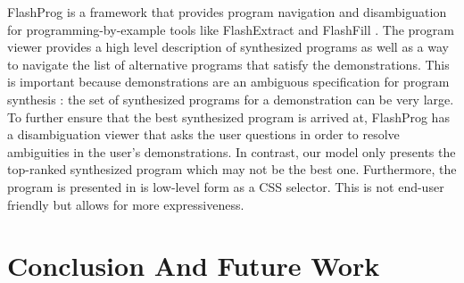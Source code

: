 \documentclass[sigconf,10pt]{acmart}
\begin{document}
FlashProg \citep{mayer2015} is a framework that provides program
navigation and disambiguation for programming-by-example tools like
FlashExtract \citep{le2014} and FlashFill \citep{harris}. The program
viewer provides a high level description of synthesized programs as well
as a way to navigate the list of alternative programs that satisfy the
demonstrations. This is important because demonstrations are an
ambiguous specification for program synthesis \citep{peleg2018}: the set
of synthesized programs for a demonstration can be very large. To
further ensure that the best synthesized program is arrived at,
FlashProg has a disambiguation viewer that asks the user questions in
order to resolve ambiguities in the user's demonstrations. In contrast,
our model only presents the top-ranked synthesized program which may not
be the best one. Furthermore, the program is presented in is low-level
form as a CSS selector. This is not end-user friendly but allows for
more expressiveness.

\hypertarget{sec:conclusion}{%
\section{Conclusion And Future Work}\label{sec:conclusion}}




\end{document}
